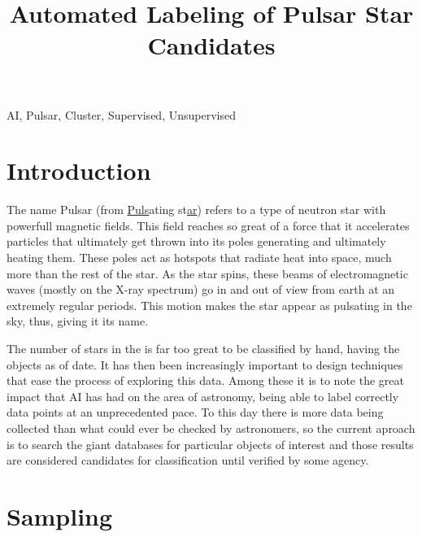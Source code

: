 \documentclass[conference]{IEEEtran}
\begin{document}
\title{Automated Labeling of Pulsar Star Candidates}

\author{
}

\maketitle

\begin{abstract}
\todo{}
\end{abstract}

\begin{IEEEkeywords}
AI, Pulsar, Cluster, Supervised, Unsupervised
\end{IEEEkeywords}

\section{Introduction}
\todo{}
The name Pulsar (from \underline{Puls}ating st\underline{ar}) refers to a
type of neutron star with powerfull magnetic fields.\cite{nasa:pulsar}
This field reaches so great of a force that it accelerates particles that 
ultimately get thrown into its poles generating and ultimately heating them.
These poles act as hotspots that radiate heat into space, much more than
the rest of the star. As the star spins, these beams of electromagnetic
waves (mostly on the X-ray spectrum) go in and out of view from earth at an
extremely regular periods. This motion makes the star appear as pulsating
in the sky, thus, giving it its name.

The number of stars in the  is far too great to be
classified by hand, having the  objects as of
date. It has then been increasingly important to design techniques that ease
the process of exploring this data. Among these it is to note the great impact
that AI has had on the area of astronomy, being able to label correctly
data points at an unprecedented pace. \todo{}To this day there is more data
being collected than what could ever be checked by astronomers, so the current
aproach is to search the giant databases for particular objects of interest and
those results are considered candidates for classification until verified by
some agency. 

\section{Sampling}
\end{document}
